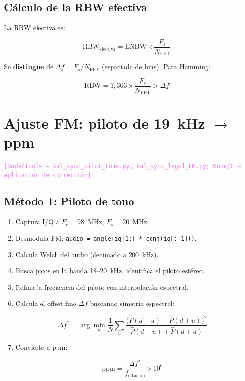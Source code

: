 \documentclass[11pt,a4paper]{article}
\newcommand{\where}[1]{\textcolor{violet}{\texttt{[#1]}}}
\begin{document}
\subsection{Cálculo de la RBW efectiva}

La RBW efectiva es:

\begin{equation}
\text{RBW}_{\text{efectiva}} = \text{ENBW} \times \frac{F_s}{N_{\text{FFT}}}
\label{eq:rbw}
\end{equation}

Se \textbf{distingue} de $\Delta f = F_s / N_{\text{FFT}}$ (espaciado de bins). Para Hamming:

\begin{equation}
\text{RBW} = 1{,}363 \times \frac{F_s}{N_{\text{FFT}}} > \Delta f
\label{eq:rbw_vs_df}
\end{equation}

\section{Ajuste FM: piloto de 19~kHz $\to$ ppm}
\label{sec:fm_ppm}

\where{Node/Tools — \texttt{kal\_sync\_pilot\_tone.py}, \texttt{kal\_sync\_legal\_FM.py}; Node/C — aplicación de corrección}

\subsection{Método 1: Piloto de tono}

\begin{enumerate}
\item Captura I/Q a $F_c = 98$~MHz, $F_s = 20$~MHz.
\item Desmodula FM: \texttt{audio = angle(iq[1:] * conj(iq[:-1]))}.
\item Calcula Welch del audio (decimado a 200~kHz).
\item Busca picos en la banda 18--20~kHz, identifica el piloto estéreo.
\item Refina la frecuencia del piloto con interpolación espectral.
\item Calcula el offset fino $\Delta f$ buscando simetría espectral:

\begin{equation}
\Delta f^* = \arg\min_{d} \frac{1}{N}\sum_u \frac{\big(\hat{P}(d-u) - \hat{P}(d+u)\big)^2}{\hat{P}(d-u) + \hat{P}(d+u)}
\label{eq:fine_offset}
\end{equation}

\item Convierte a ppm:

\begin{equation}
\text{ppm} = \frac{\Delta f^*}{f_{\text{estación}}} \times 10^6
\label{eq:ppm}
\end{equation}
\end{enumerate}
\end{document}

